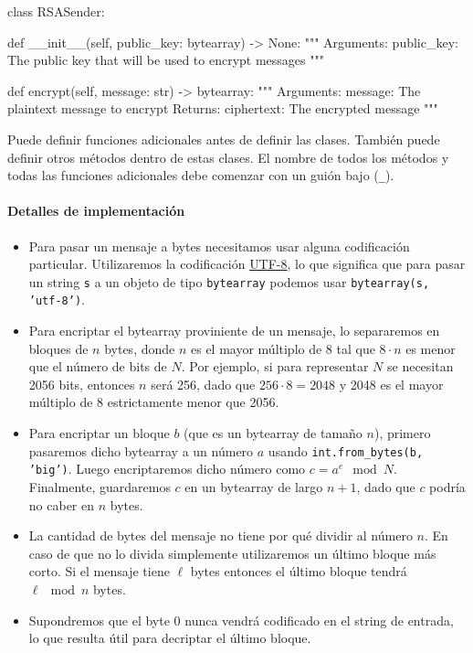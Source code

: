 \begin{python}
  class RSASender:
    
    def __init__(self, public_key: bytearray) -> None:
    """
    Arguments:
      public_key: The public key that will be used to encrypt messages
    """

    def encrypt(self, message: str) -> bytearray:
    """
    Arguments:
      message: The plaintext message to encrypt
    Returns:
      ciphertext: The encrypted message
    """
\end{python}

Puede definir funciones adicionales antes de definir las clases. También puede definir otros métodos dentro de estas clases. El nombre de todos los métodos y todas las funciones adicionales debe comenzar con un guión bajo (\texttt{\_}).

\paragraph{Detalles de implementación}
\begin{itemize}
  \item Para pasar un mensaje a bytes necesitamos usar alguna codificación particular. Utilizaremos la codificación \href{https://en.wikipedia.org/wiki/UTF-8}{UTF-8}, lo que significa que para pasar un string \texttt{s} a un objeto de tipo \texttt{bytearray} podemos usar \texttt{bytearray(s, 'utf-8')}.
  \item Para encriptar el bytearray proviniente de un mensaje, lo separaremos en bloques de $n$ bytes, donde $n$ es el mayor múltiplo de 8 tal que $8\cdot n$ es menor que el número de bits de $N$. Por ejemplo, si para representar $N$ se necesitan 2056 bits, entonces $n$ será 256, dado que $256\cdot 8=2048$ y 2048 es el mayor múltiplo de 8 estrictamente menor que 2056.
  \item Para encriptar un bloque $b$ (que es un bytearray de tamaño $n$), primero pasaremos dicho bytearray a un número $a$ usando \texttt{int.from\_bytes(b, 'big')}. Luego encriptaremos dicho número como $c=a^e\mod N$. Finalmente, guardaremos $c$ en un bytearray de largo $n+1$, dado que $c$ podría no caber en $n$ bytes.
  \item La cantidad de bytes del mensaje no tiene por qué dividir al número $n$. En caso de que no lo divida simplemente utilizaremos un último bloque más corto. Si el mensaje tiene $\ell$ bytes entonces el último bloque tendrá $\ell\mod n$ bytes.
  \item Supondremos que el byte 0 nunca vendrá codificado en el string de entrada, lo que resulta útil para decriptar el último bloque.
\end{itemize}
